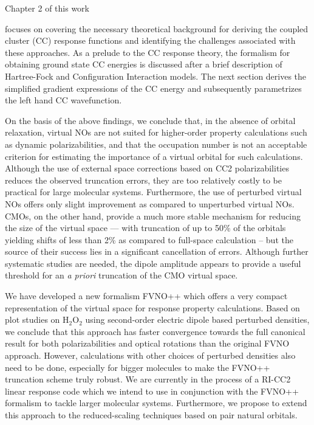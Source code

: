 Chapter 2 of this work 


focuses on covering the necessary theoretical background
for deriving the coupled cluster (CC) response functions and identifying
the challenges associated with these approaches.
As a prelude to the CC response theory, the formalism for obtaining ground state CC energies
is discussed after a brief description of Hartree-Fock and Configuration Interaction models.
The next section derives the simplified gradient expressions of the CC energy and subsequently
parametrizes the left hand CC wavefunction.


On the basis of the above findings, we conclude that, in the absence of
orbital relaxation, virtual NOs are not
suited for higher-order property calculations such as dynamic
polarizabilities, and that the occupation number is not an acceptable
criterion for estimating the importance of a virtual orbital for such
calculations.  Although the use of external space corrections based on CC2
polarizabilities reduces the observed truncation errors, they are too
relatively costly to be practical for large molecular systems.  Furthermore,
the use of perturbed virtual NOs offers only slight improvement as compared to
unperturbed virtual NOs.  CMOs, on the other hand, provide a much more stable
mechanism for reducing the size of the virtual space --- with truncation of up
to 50\% of the orbitals yielding shifts of less than 2\% as compared to
full-space calculation -- but the source of their success lies in a
significant cancellation of errors.  Although further systematic studies are
needed, the dipole amplitude appears to provide a useful threshold for an {\em
a priori} truncation of the CMO virtual space.


We have developed a new formalism FVNO++ which offers a very
compact representation of the virtual space for response
property calculations. Based on plot studies on H$_2$O$_2$ using second-order
electric dipole based perturbed densities, we conclude that this
approach has faster convergence towards the full canonical result for both
polarizabilities and optical rotations than the original FVNO approach.
However, calculations with other choices of perturbed densities also need to be
done, especially for bigger molecules to make the FVNO++ truncation scheme truly robust.
We are currently in the process of a RI-CC2 linear response code\cite{} which we intend
to use in conjunction with the FVNO++ formalism to tackle larger molecular systems.
Furthermore, we propose to extend this approach to the reduced-scaling techniques based
on pair natural orbitals\cite{}.

